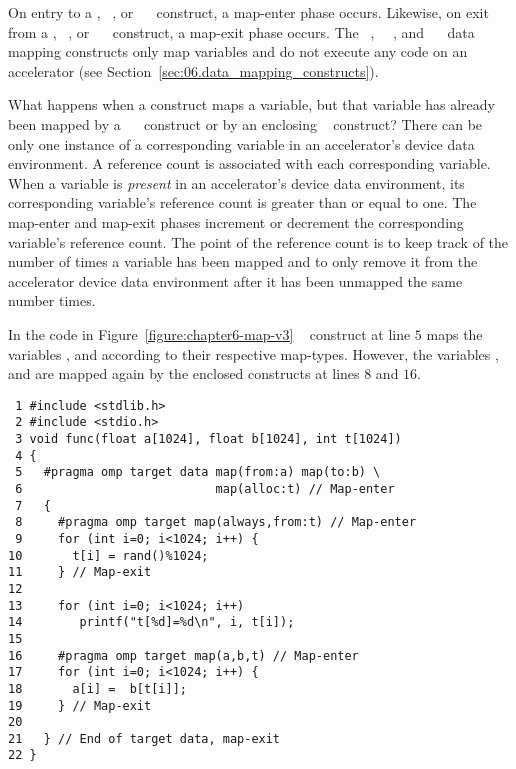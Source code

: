 On entry to a , ~, or
~~ construct, a map-enter phase occurs.
Likewise, on exit from a , ~, or
~~ construct, a map-exit phase occurs.
The ~, ~~, and
~~ data mapping constructs only map
variables and do not execute any code on an accelerator (see
Section~\ref{sec:06.data_mapping_constructs}).

What happens when a construct maps a variable, but that variable has already
been mapped by a ~~ construct or by an
enclosing ~ construct?  
There can be only one instance of a corresponding variable in an accelerator's
device data environment.  A reference count is associated with each
corresponding variable.  When a variable is \emph{present} in an accelerator's
device data environment, its corresponding variable's reference count is
greater than or equal to one.
The map-enter and map-exit phases increment or decrement the
corresponding variable's reference count.  The point of the reference count is
to keep track of the number of times a variable has been mapped and to only
remove it from the accelerator device data environment after it has been
unmapped the same number times.

In the code in
Figure~\ref{figure:chapter6-map-v3} 
~ construct at line $5$ maps the variables ,  and
 according to their respective map-types.  
However, the variables ,  and 
are mapped again by the enclosed  constructs at lines $8$ and $16$.

\begin{figure*}[!tb]
\begin{verbatim}
 1 #include <stdlib.h>
 2 #include <stdio.h>
 3 void func(float a[1024], float b[1024], int t[1024])
 4 {
 5   #pragma omp target data map(from:a) map(to:b) \
 6                           map(alloc:t) // Map-enter
 7   {
 8     #pragma omp target map(always,from:t) // Map-enter
 9     for (int i=0; i<1024; i++) {
10       t[i] = rand()%1024;
11     } // Map-exit
12 
13     for (int i=0; i<1024; i++)
14        printf("t[%d]=%d\n", i, t[i]);
15 
16     #pragma omp target map(a,b,t) // Map-enter
17     for (int i=0; i<1024; i++) {
18       a[i] =  b[t[i]];
19     } // Map-exit
20 
21   } // End of target data, map-exit
22 }
\end{verbatim}
\caption{ \textbf {Example of a variable appearing in nested map clauses} -- \small
          There is only one instance of a variable in an accelerator's
          address space.
         }
\label{figure:chapter6-map-v3}
\end{figure*}

